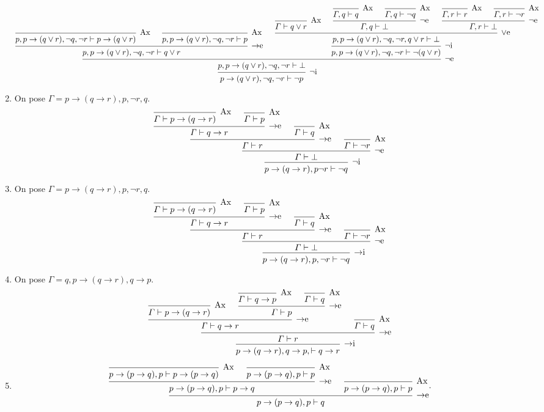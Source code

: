 \begin{enumerate}
\[\begin{prooftree}
				\infer 0[Ax]{p,p \to  (q \lor r), \lnot q, \lnot r  \vdash p \to (q \lor r)}
				\infer 0[Ax]{p,p \to  (q \lor r), \lnot q, \lnot r \vdash p}
				\infer 2[$\to$e]{p,p \to  (q \lor r), \lnot q, \lnot r \vdash q \lor r}
				\infer 0[Ax]{\Gamma \vdash q \lor r}
				\infer 0[Ax]{\Gamma,q \vdash q}
				\infer 0[Ax]{\Gamma,q \vdash \lnot q}
				\infer 2[$\lnot$e]{\Gamma, q \vdash \bot}
				\infer 0[Ax]{\Gamma, r \vdash r}
				\infer 0[Ax]{\Gamma, r \vdash \lnot r}
				\infer 2[$\lnot$e]{\Gamma, r \vdash \bot}
				\infer 3[$\lor$e]{p,p \to  (q \lor r), \lnot q, \lnot r, q \lor r \vdash \bot}
				\infer 1[$\lnot$i]{p,p \to  (q \lor r), \lnot q, \lnot r\vdash \lnot (q \lor r)}
				\infer 2[$\lnot$e]{p,p \to  (q \lor r), \lnot q, \lnot r \vdash \bot}
				\infer 1[$\lnot$i]{p \to  (q \lor r), \lnot q, \lnot r \vdash \lnot p}
			\end{prooftree}
		\]
	\item On pose $\Gamma = p \to (q \to r), p, \lnot r, q$.
		\[
			\begin{prooftree}
				\infer 0[Ax]{\Gamma \vdash p \to (q \to r)}
				\infer 0[Ax]{\Gamma \vdash p}
				\infer 2[$\to$e]{\Gamma \vdash q \to r}
				\infer 0[Ax]{\Gamma \vdash q}
				\infer 2[$\to$e]{\Gamma \vdash r}
				\infer 0[Ax]{\Gamma \vdash \lnot r}
				\infer 2[$\lnot$e]{\Gamma \vdash \bot}
				\infer 1[$\lnot$i]{p \to (q\to r),p \lnot r \vdash \lnot q}
			\end{prooftree}
		\]
	\item On pose $\Gamma = p \to (q \to r), p, \lnot r, q$.
		\[
			\begin{prooftree}
				\infer 0[Ax]{\Gamma \vdash p \to (q \to r)}
				\infer 0[Ax]{\Gamma \vdash p}
				\infer 2[$\to$e]{\Gamma \vdash q \to r}
				\infer 0[Ax]{\Gamma \vdash q}
				\infer 2[$\to$e]{\Gamma \vdash r}
				\infer 0[Ax]{\Gamma \vdash \lnot r}
				\infer 2[$\lnot$e]{\Gamma \vdash \bot}
				\infer 1[$\to$i]{p \to (q \to r), p, \lnot r \vdash \lnot q}
			\end{prooftree}
		\]
	\item On pose $\Gamma = q, p \to (q \to r), q \to p$.
		\[
			\begin{prooftree}
				\infer 0[Ax]{\Gamma \vdash p \to (q \to r)}
				\infer 0[Ax]{\Gamma \vdash q \to p}
				\infer 0[Ax]{\Gamma \vdash q}
				\infer 2[$\to$e]{\Gamma \vdash p}
				\infer 2[$\to$e]{\Gamma \vdash q \to r}
				\infer 0[Ax]{\Gamma \vdash q}
				\infer 2[$\to$e]{\Gamma \vdash r}
				\infer 1[$\to$i]{p \to (q \to r), q \to p, \vdash q \to r}
			\end{prooftree}
		\]
	\item
		\[
			\begin{prooftree}
				\infer 0[Ax]{p \to (p \to q),p \vdash p \to (p \to q)}
				\infer 0[Ax]{p \to (p \to q),p \vdash p}
				\infer 2[$\to$e]{p \to (p\to q),p \vdash p \to q}
				\infer 0[Ax]{p \to (p \to q),p \vdash p}
				\infer 2[$\to$e]{p \to (p \to q),p \vdash q}
			\end{prooftree}
		.\]
\end{enumerate}
